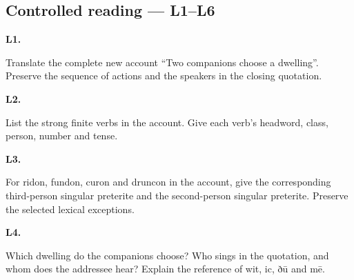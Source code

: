 \subsection*{Controlled reading — L1–L6}

\par\begin{minipage}{\linewidth}\raggedright
\textbf{L1.}

Translate the complete new account “Two companions choose a dwelling”. Preserve the sequence of actions and the speakers in the closing quotation.

\end{minipage}\par\addvspace{4pt}

\par\begin{minipage}{\linewidth}\raggedright
\textbf{L2.}

List the strong finite verbs in the account. Give each verb’s headword, class, person, number and tense.

\end{minipage}\par\addvspace{4pt}

\par\begin{minipage}{\linewidth}\raggedright
\textbf{L3.}

For ridon, fundon, curon and druncon in the account, give the corresponding third-person singular preterite and the second-person singular preterite. Preserve the selected lexical exceptions.

\end{minipage}\par\addvspace{4pt}

\par\begin{minipage}{\linewidth}\raggedright
\textbf{L4.}

Which dwelling do the companions choose? Who sings in the quotation, and whom does the addressee hear? Explain the reference of wit, ic, ðū and mē.

\end{minipage}\par\addvspace{4pt}

